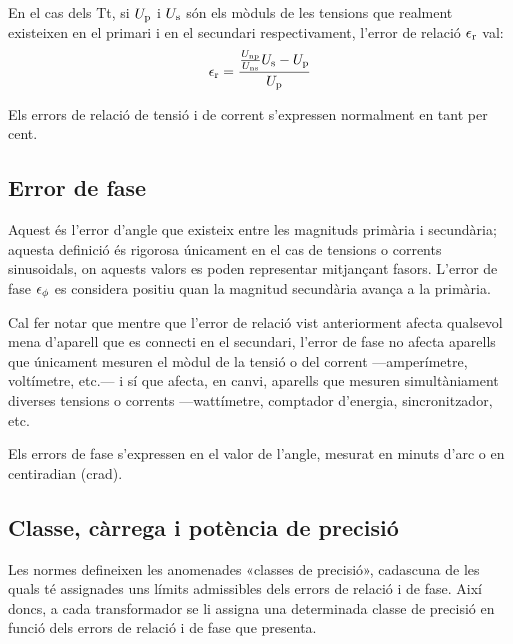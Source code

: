 En el cas dels Tt, si $U_\mathrm{p}$ i $U_\mathrm{s}$ són els mòduls de les tensions que
realment existeixen en el primari i en el secundari respectivament,
l'error de relació $\epsilon_\mathrm{r}$ val:
\begin{equation}
    \epsilon_\mathrm{r} = \frac{\frac{U_\mathrm{np}}{U_\mathrm{ns}} U_\mathrm{s} - U_\mathrm{p}} {U_\mathrm{p}}
\end{equation}

Els errors de relació de tensió i de corrent s'expressen
normalment en tant per cent.

\subsection{Error de fase}

Aquest és l'error d'angle  que existeix entre les magnituds primària i
secundària; aquesta definició és rigorosa únicament en el cas de
tensions o corrents sinusoidals, on aquests valors es poden
representar mitjançant fasors. L'error de fase $\epsilon\ped{\phi}$ es considera positiu quan la magnitud secundària avança a la primària.
\index{$\epsilon\ped{\phi}$}

 Cal fer notar que mentre que l'error de relació
vist anteriorment afecta qualsevol mena d'aparell que es
connecti en el secundari, l'error de fase no afecta aparells que
únicament mesuren el mòdul de la tensió o del corrent ---amperímetre,
voltímetre, etc.--- i sí que afecta, en canvi, aparells que mesuren
simultàniament diverses tensions o corrents ---wattímetre, comptador
d'energia, sincronitzador, etc.

Els errors de fase s'expressen en el valor de l'angle, mesurat en
minuts d'arc o en centiradian (crad).

\subsection{Classe, càrrega i potència de precisió}

Les normes defineixen les anomenades «classes de precisió»,
cadascuna de les quals té assignades uns límits admissibles dels
errors de relació i de fase. Així doncs, a cada transformador
se li assigna una determinada classe de precisió en funció dels errors
de relació i de fase que presenta.


